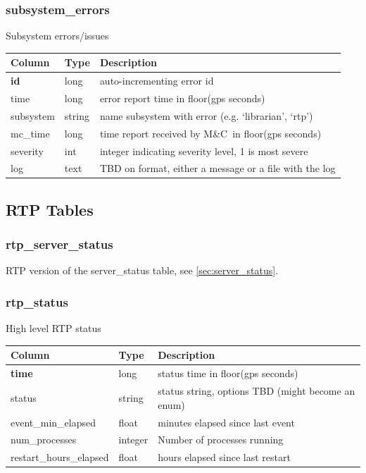 \documentclass{article}
\newcommand{\mc}{M\&C}
\begin{document}
\subsubsection{subsystem\_errors}
Subsystem errors/issues
\begin{center}
 \begin{tabular}{| p{4cm} | p{2cm} | p{10cm} |}
\hline
 {\bf Column} & {\bf Type}  & {\bf Description} \\ [0.5ex]  \hline\hline
\textbf{id} & long & auto-incrementing error id\\ \hline
time & long & error report time in floor(gps seconds)\\ \hline
subsystem & string & name subsystem with error (e.g. `librarian', `rtp')\\ \hline
mc\_time & long & time report received by \mc\ in floor(gps seconds) \\ \hline
severity & int & integer indicating severity level, 1 is most severe \\ \hline
log & text & TBD on format, either a message or a file with the log \\ \hline
\end{tabular}
\end{center}




\subsection{RTP Tables}
\subsubsection{rtp\_server\_status}
RTP version of the server\_status table, see \ref{sec:server_status}.

\subsubsection{rtp\_status}
High level RTP status
\begin{center}
 \begin{tabular}{| p{4cm} | p{2cm} | p{10cm} |}
\hline
 {\bf Column} & {\bf Type}  & {\bf Description} \\ [0.5ex]  \hline\hline
\textbf{time} & long & status time in floor(gps seconds)\\ \hline
status & string & status string, options TBD (might become an enum) \\\hline
event\_min\_elapsed & float & minutes elapsed since last event \\\hline
num\_processes & integer & Number of processes running  \\\hline
restart\_hours\_elapsed & float & hours elapsed since last restart \\\hline
\end{tabular}
\end{center}
\end{document}
